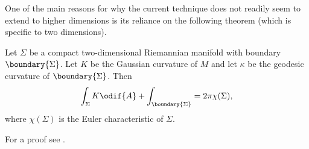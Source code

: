 \documentclass[titlepage,numbers=noenddot,headinclude,oneside,%
footinclude=true,cleardoublepage=empty,%
BCOR=5mm,paper=a4,fontsize=11pt,%
english,%
]{scrartcl}
\begin{document}
One of the main reasons for why the current technique does not readily seem to extend to higher dimensions is its reliance on the following theorem (which is specific to two dimensions).
\begin{theorem}\label{thm:gauss-bonnet}
   Let \( \Sigma \) be a compact two-dimensional Riemannian manifold with boundary \( \boundary{\Sigma} \). Let \( K \) be the Gaussian curvature of \( M \) and let \( \kappa \) be the geodesic curvature of \( \boundary{\Sigma} \). Then
   \begin{equation*}
    \int_\Sigma K \odif{A}+\int_{\boundary{\Sigma}}=2\pi \chi(\Sigma),
   \end{equation*} 
   where \( \chi(\Sigma) \) is the Euler characteristic of \( \Sigma \).
\end{theorem}
For a proof see \cite[Chapter 4.3]{petersenRiemannianGeometry2006}.
\end{document}
